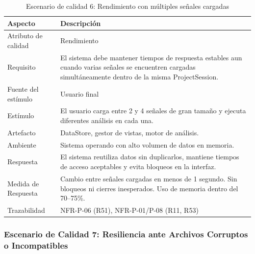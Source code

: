 \documentclass[11pt,a4paper]{article}
\DeclareRobustCommand{\_}{\textunderscore\allowbreak}
\begin{document}
\begin{table}[H]
\centering
\caption{Escenario de calidad 6: Rendimiento con múltiples señales cargadas}
\label{tab:escenario6}
\begin{tabularx}{\textwidth}{|l|X|}
\hline
\textbf{Aspecto} & \textbf{Descripción} \\
\hline
Atributo de calidad & Rendimiento \\
\hline
Requisito & El sistema debe mantener tiempos de respuesta estables aun cuando varias señales se encuentren cargadas simultáneamente dentro de la misma ProjectSession. \\
\hline
Fuente del estímulo & Usuario final \\
\hline
Estímulo & El usuario carga entre 2 y 4 señales de gran tamaño y ejecuta diferentes análisis en cada una. \\
\hline
Artefacto & DataStore, gestor de vistas, motor de análisis. \\
\hline
Ambiente & Sistema operando con alto volumen de datos en memoria. \\
\hline
Respuesta & El sistema reutiliza datos sin duplicarlos, mantiene tiempos de acceso aceptables y evita bloqueos en la interfaz. \\
\hline
Medida de Respuesta & Cambio entre señales cargadas en menos de 1 segundo. Sin bloqueos ni cierres inesperados. Uso de memoria dentro del 70--75\%. \\
\hline
Trazabilidad & NFR-P-06 (R51), NFR-P-01/P-08 (R11, R53) \\
\hline
\end{tabularx}
\end{table}

\subsubsection{Escenario de Calidad 7: Resiliencia ante Archivos Corruptos o Incompatibles}
\end{document}
